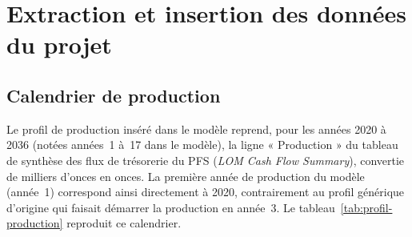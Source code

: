 \section{Extraction et insertion des données du projet}
\label{sec:donnees-pfs}

\subsection{Calendrier de production}

Le profil de production inséré dans le modèle reprend, pour les années 2020 à 2036 (notées années~1 à~17 dans le modèle), la ligne « Production » du tableau de synthèse des flux de trésorerie du PFS (\emph{LOM Cash Flow Summary}), convertie de milliers d'onces en onces. La première année de production du modèle (année~1) correspond ainsi directement à 2020, contrairement au profil générique d'origine qui faisait démarrer la production en année~3. Le tableau~\ref{tab:profil-production} reproduit ce calendrier.

